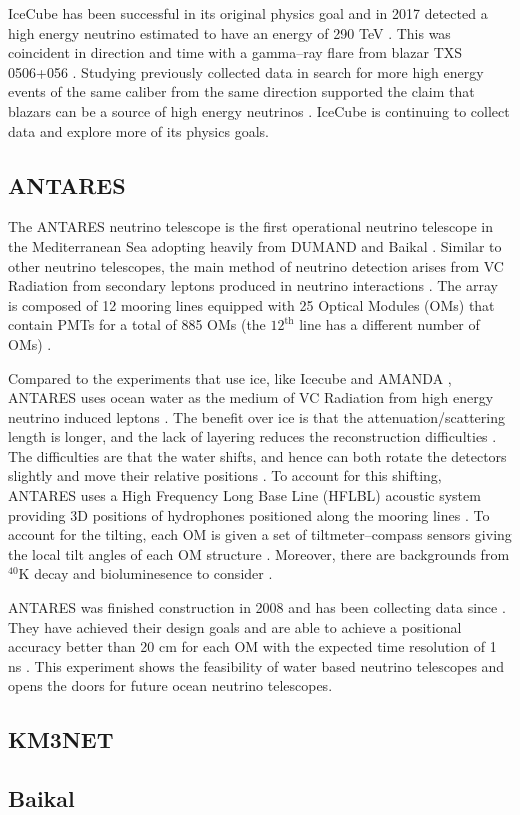 IceCube has been successful in its original physics goal \cite{icecube} and in 2017 detected a high energy neutrino estimated to have an energy of 290 TeV \cite{icecube_nat}. This was coincident in direction and time with a gamma--ray flare from blazar TXS 0506+056 \cite{icecube_nat}. Studying previously collected data in search for more high energy events of the same caliber from the same direction supported the claim that blazars can be a source of high energy neutrinos \cite{icecube_nat}. IceCube is continuing to collect data and explore more of its physics goals.

\subsection{ANTARES}

The ANTARES neutrino telescope is the first operational neutrino telescope in the Mediterranean Sea \cite{antares} adopting heavily from DUMAND \cite{dumand} and Baikal \cite{baikal}. Similar to other neutrino telescopes, the main method of neutrino detection arises from VC Radiation from secondary leptons produced in neutrino interactions \cite{antares}. The array is composed of 12 mooring lines equipped with 25 Optical Modules (OMs) that contain PMTs for a total of 885 OMs (the $12^{\text{th}}$ line has a different number of OMs) \cite{antares}.

Compared to the experiments that use ice, like Icecube \cite{icecube, icecube_nat, icecube_rad} and AMANDA \cite{amanda}, ANTARES uses ocean water as the medium of VC Radiation from high energy neutrino induced leptons \cite{antares}. The benefit over ice is that the attenuation/scattering length is longer, and the lack of layering reduces the reconstruction difficulties \cite{antares, icecube_rad}. The difficulties are that the water shifts, and hence can both rotate the detectors slightly and move their relative positions \cite{antares, icecube_rad}. To account for this shifting, ANTARES uses a High Frequency Long Base Line (HFLBL) acoustic system providing 3D positions of hydrophones positioned along the mooring lines \cite{antares}. To account for the tilting, each OM is given a set of tiltmeter--compass sensors giving the local tilt angles of each OM structure \cite{antares}. Moreover, there are backgrounds from $^{40}$K decay and bioluminesence to consider \cite{icecube_rad}.

ANTARES was finished construction in 2008 and has been collecting data since \cite{antares}. They have achieved their design goals and are able to achieve a positional accuracy better than 20 cm for each OM with the expected time resolution of 1 ns \cite{antares}. This experiment shows the feasibility of water based neutrino telescopes and opens the doors for future ocean neutrino telescopes. 

\subsection{KM3NET}



\subsection{Baikal}
